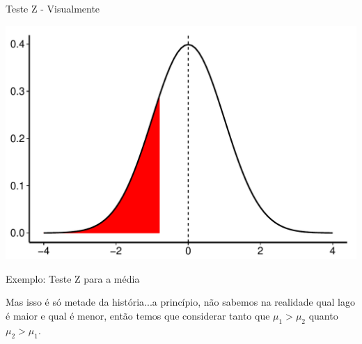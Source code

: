 \documentclass{beamer}\usepackage[]{graphicx}\usepackage[]{color}
\makeatletter
\def\maxwidth{ %
  \ifdim\Gin@nat@width>\linewidth
    \linewidth
  \else
    \Gin@nat@width
  \fi
}
\newenvironment{knitrout}{}{} %
\renewenvironment{knitrout}{\setlength{\topsep}{0mm}}{}
\makeatother
\begin{document}
\begin{frame}[fragile]{Teste Z -  Visualmente}

\begin{knitrout}
\color{fgcolor}
\includegraphics[width=\maxwidth,height=0.7\textheight]{figure/testez2-1} 

\end{knitrout}

\end{frame} 



\begin{frame}{Exemplo: Teste Z para a média}

Mas isso é só metade da história...a princípio, não sabemos na realidade qual lago é maior e qual é menor, então temos que considerar tanto que $\mu_1 > \mu_2$ quanto $\mu_2 > \mu_1$.


\end{frame} 
\end{document}
